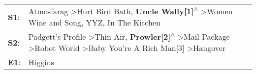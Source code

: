 \begin{supertabular}{p{0.03\textwidth}p{0.92\textwidth}}
 \textbf{S1}:  &                                                                                    Atmosfarag\textsuperscript{} \textgreater \enspace Hurt Bird Bath\textsuperscript{}, \enspace \textbf{Uncle Wally[1]\textsuperscript{$\wedge$}} \textgreater \enspace Women Wine and Song\textsuperscript{}, \enspace YYZ\textsuperscript{}, \enspace In The Kitchen\textsuperscript{}  \enspace  \\
 \textbf{S2}:  &  Padgett's Profile\textsuperscript{} \textgreater \enspace Thin Air\textsuperscript{}, \enspace \textbf{Prowler[2]\textsuperscript{$\wedge$}} \textgreater \enspace Mail Package\textsuperscript{} \textgreater \enspace Robot World\textsuperscript{} \textgreater \enspace Baby You're A Rich Man[3]\textsuperscript{} \textgreater \enspace Hangover\textsuperscript{}  \enspace  \\
 \textbf{E1}:  &                                                                                                                                                                                                                                                                                                                                                 Higgins\textsuperscript{}  \enspace  \\
\end{supertabular}
